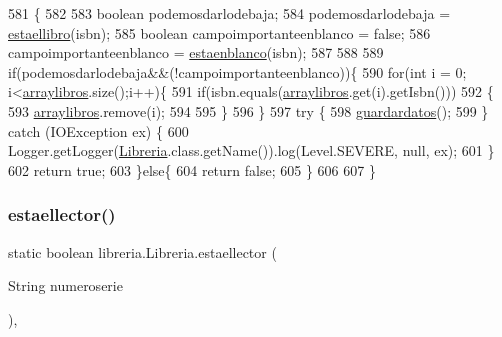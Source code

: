 \begin{DoxyCode}
581                                                       \{
582          
583         \textcolor{keywordtype}{boolean} podemosdarlodebaja;
584         podemosdarlodebaja = \mbox{\hyperlink{classlibreria_1_1_libreria_a0af77d7fa2b6f3c0a0b218ee9df08ce3}{estaellibro}}(isbn);
585         \textcolor{keywordtype}{boolean} campoimportanteenblanco = \textcolor{keyword}{false};
586         campoimportanteenblanco = \mbox{\hyperlink{classlibreria_1_1_libreria_afca98a0ea16507ff5cc9bc0dde706abb}{estaenblanco}}(isbn);
587         
588         
589         \textcolor{keywordflow}{if}(podemosdarlodebaja&&(!campoimportanteenblanco))\{
590             \textcolor{keywordflow}{for}(\textcolor{keywordtype}{int} i = 0; i<\mbox{\hyperlink{classlibreria_1_1_libreria_aa55c2bad2db92eb94ea1ba9c6997f47d}{arraylibros}}.size();i++)\{
591                 \textcolor{keywordflow}{if}(isbn.equals(\mbox{\hyperlink{classlibreria_1_1_libreria_aa55c2bad2db92eb94ea1ba9c6997f47d}{arraylibros}}.get(i).getIsbn()))
592                 \{
593                     \mbox{\hyperlink{classlibreria_1_1_libreria_aa55c2bad2db92eb94ea1ba9c6997f47d}{arraylibros}}.remove(i);
594                     
595                 \}
596             \}
597             \textcolor{keywordflow}{try} \{
598                      \mbox{\hyperlink{classlibreria_1_1_libreria_abc10249e70e74a9ba55a081bbf23cfcd}{guardardatos}}();
599                  \} \textcolor{keywordflow}{catch} (IOException ex) \{
600                      Logger.getLogger(\mbox{\hyperlink{classlibreria_1_1_libreria_a93220dd4de47ee3b7ef4b2a90701c253}{Libreria}}.class.getName()).log(Level.SEVERE, null, ex);
601                  \}
602             \textcolor{keywordflow}{return} \textcolor{keyword}{true};
603         \}\textcolor{keywordflow}{else}\{
604             \textcolor{keywordflow}{return} \textcolor{keyword}{false};
605         \}
606          
607      \}
\end{DoxyCode}
\mbox{\label{classlibreria_1_1_libreria_a1d272b2c2f64bbeaa6e24f4f8c5ba2e7}} 
\subsubsection{\texorpdfstring{estaellector()}{estaellector()}}
{\footnotesize\ttfamily static boolean libreria.\+Libreria.\+estaellector (\begin{DoxyParamCaption}\item[{String}]{numeroserie }\end{DoxyParamCaption})\hspace{0.3cm}{\ttfamily [inline]}, {\ttfamily [static]}}

